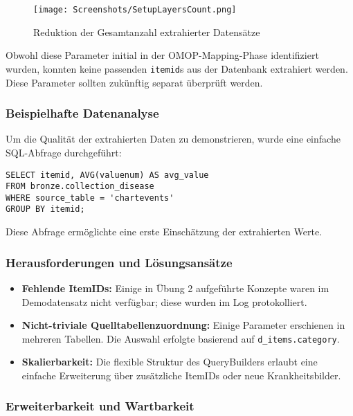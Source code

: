 \documentclass[12pt]{article}
\begin{document}
\begin{figure}[htbp]
\centering
\texttt{[image: Screenshots/SetupLayersCount.png]}
\caption{Reduktion der Gesamtanzahl extrahierter Datensätze}
\label{fig:hr_high}
\end{figure}

Obwohl diese Parameter initial in der OMOP-Mapping-Phase identifiziert wurden, konnten keine passenden \texttt{itemid}s aus der Datenbank extrahiert werden. Diese Parameter sollten zukünftig separat überprüft werden.

\subsubsection{Beispielhafte Datenanalyse}

Um die Qualität der extrahierten Daten zu demonstrieren, wurde eine einfache SQL-Abfrage durchgeführt:

\begin{lstlisting}
SELECT itemid, AVG(valuenum) AS avg_value
FROM bronze.collection_disease
WHERE source_table = 'chartevents'
GROUP BY itemid;
\end{lstlisting}


Diese Abfrage ermöglichte eine erste Einschätzung der extrahierten Werte.

\subsubsection{Herausforderungen und Lösungsansätze}

\begin{itemize}
    \item \textbf{Fehlende ItemIDs:} Einige in Übung 2 aufgeführte Konzepte waren im Demodatensatz nicht verfügbar; diese wurden im Log protokolliert.
    \item \textbf{Nicht-triviale Quelltabellenzuordnung:} Einige Parameter erschienen in mehreren Tabellen. Die Auswahl erfolgte basierend auf \texttt{d\_items.category}.
    \item \textbf{Skalierbarkeit:} Die flexible Struktur des QueryBuilders erlaubt eine einfache Erweiterung über zusätzliche ItemIDs oder neue Krankheitsbilder.
\end{itemize}

\subsubsection{Erweiterbarkeit und Wartbarkeit}
\end{document}

